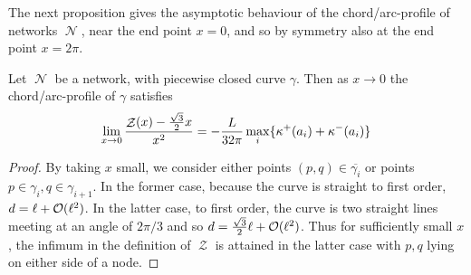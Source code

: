 \documentclass[11pt]{amsart}
\DeclareMathOperator{\chordarcprofile}{\mathcal{Z}}
\DeclareMathOperator{\network}{\mathcal{N}}
\begin{document}
The next proposition gives the asymptotic behaviour of the chord/arc-profile of networks \(\network\), near the end point \(x=0\), and so by symmetry also at the end point \(x=2\pi\).

\begin{prop}
\label{prop:asymptotics}
Let \(\network\) be a network, with piecewise closed curve \(\gamma\). Then as \(x\to 0\) the chord/arc-profile of \(\gamma\) satisfies
\[
\lim_{x\to 0} \frac{\chordarcprofile(x) - \tfrac{\sqrt{3}}{2}x}{x^2} = - \frac{L}{32\pi} \max_i \{\curvecurv^+(a_i) + \curvecurv^-(a_i)\}
\]
\end{prop}

\begin{proof}
By taking $x$ small, we consider either points $(p,q) \in \overline{\gamma_i}$ or points $p \in \gamma_i, q \in \gamma_{i+1}$. In the former case, because the curve is straight to first order, $d = \ell + \operatorname{\mathcal{O}}(\ell^2)$. In the latter case, to first order, the curve is two straight lines meeting at an angle of $2\pi/3$ and so $d = \tfrac{\sqrt{3}}{2} \ell + \operatorname{\mathcal{O}}(\ell^2)$. Thus for sufficiently small $x$, the infimum in the definition of $\chordarcprofile$ is attained in the latter case with $p,q$ lying on either side of a node.


\end{proof}
\end{document}
